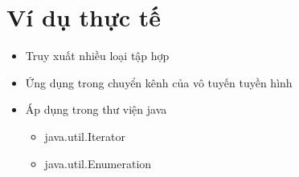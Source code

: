\newpage
\section{Ví dụ thực tế}
\begin{itemize}
    \item Truy xuất nhiều loại tập hợp
    \item Ứng dụng trong chuyển kênh của vô tuyến tuyền hình
    \item Áp dụng trong thư viện java
    \begin{itemize}
        \item java.util.Iterator 
        \item java.util.Enumeration
    \end{itemize}
\end{itemize}


